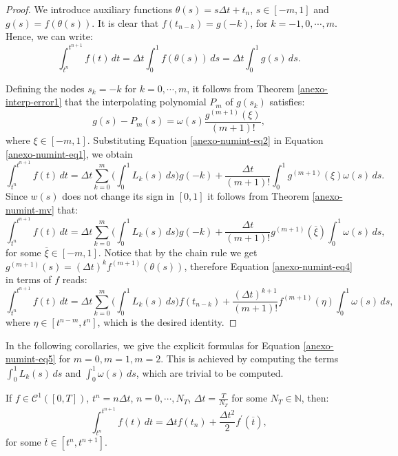 \begin{proof}
	We introduce auxiliary functions $\theta(s) = s\Delta t + t_n$, $s \in [-m,1]$ and $g(s) = f(\theta(s))$.
	It is clear that $f(t_{n-k}) = g(-k)$, for $k=-1,0, \cdots, m$.
	Hence, we can write:
	\begin{equation}
		\label{anexo-numint-eq1}
		\int_{t^n}^{t^{n+1}} f(t)\,dt = \Delta t \int_{0}^{1} f(\theta(s))\,ds = \Delta t \int_{0}^{1} g(s)\,ds.
	\end{equation}
	
	Defining the nodes $s_k=-k$ for $k=0, \cdots, m$, it follows from Theorem 
	\ref{anexo-interp-error1} that the interpolating polynomial $P_m$ of $g(s_k)$ satisfies:
	\begin{equation}
		\label{anexo-numint-eq2}
		g(s)-P_m(s) = \omega(s)\frac{g^{(m+1)}(\xi)}{(m+1)!},
	\end{equation}
	where $\xi \in [-m,1]$.
	Substituting Equation \eqref{anexo-numint-eq2} in Equation \eqref{anexo-numint-eq1}, we obtain
	\begin{equation}
		\label{anexo-numint-eq3}
		\int_{t^n}^{t^{n+1}} f(t)\,dt = \Delta t \sum_{k=0}^{m} \bigg(\int_{0}^{1} L_k(s) \,ds \bigg) g(-k)
		+ \frac{\Delta t}{(m+1)!} \int_{0}^{1} g^{(m+1)}(\xi) \omega(s)\,ds.
	\end{equation}
	Since $w(s)$ does not change its sign in $[0,1]$ it follows from Theorem \ref{anexo-numint-mv} that:
	\begin{equation}
		\label{anexo-numint-eq4}
		\int_{t^n}^{t^{n+1}} f(t)\,dt = \Delta t \sum_{k=0}^{m} \bigg(\int_{0}^{1} L_k(s) \,ds \bigg) g(-k)
		+ \frac{\Delta t}{(m+1)!} g^{(m+1)}(\overline{\xi})\int_{0}^{1} \omega(s)\,ds, 
	\end{equation}
	for some $\overline{\xi} \in [-m,1]$. 
	Notice that by the chain rule we get $g^{(m+1)}(s) = (\Delta t)^k f^{(m+1)}(\theta(s))$, therefore
	Equation \eqref{anexo-numint-eq4} in terms of $f$ reads:
	\begin{equation}
		\label{anexo-numint-eq5}
		\int_{t^n}^{t^{n+1}} f(t)\,dt = \Delta t \sum_{k=0}^{m} \bigg(\int_{0}^{1} L_k(s) \,ds \bigg) f(t_{n-k})
		+ \frac{(\Delta t)^{k+1}}{(m+1)!} f^{(m+1)}({\eta})\int_{0}^{1} \omega(s)\,ds, 
	\end{equation}
	where $\eta \in [t^{n-m},t^n]$, which is the desired identity.
\end{proof}

In the following corollaries, we give the explicit formulas for Equation \eqref{anexo-numint-eq5}
for $m=0,m=1,m=2$. This is achieved by computing the terms $\int_{0}^{1} L_k(s) \,ds$ and $\int_{0}^{1} \omega(s)\,ds$,
which are trivial to be computed.
\begin{corollary}
	\label{anexo-numint-col1}
	If $f\in \mathcal{C}^1([0,T])$, $t^n = n\Delta t$, $n=0, \cdots, N_T$, $\Delta t = \frac{T}{N_T}$ for some 
	$N_T \in \mathbb{N}$, then:
	\begin{equation}
		\int_{t^n}^{t^{n+1}} f(t)\,dt = \Delta t  f(t_{n})
		+ \frac{\Delta t^{2}}{2} f^{'}(\overline{t}),
	\end{equation}
	for some $\overline{t} \in [t^n, t^{n+1}]$.
\end{corollary}

